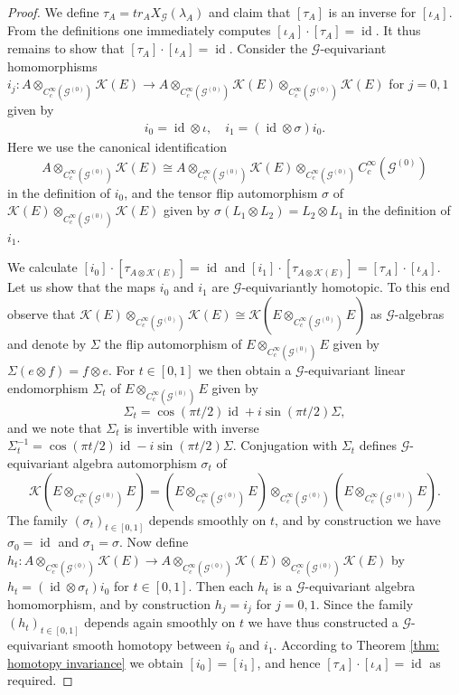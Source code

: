 \documentclass[10pt,a4paper]{amsart}
\DeclareMathOperator{\id}{id}
\newcommand{\G}{\mathcal{G}}
\newcommand{\K}{\mathcal{K}}
\newcommand{\ccinfty}{C_c^\infty}
\begin{document}
\begin{proof}
We define $ \tau_A = tr_A X_\G(\lambda_A) $ and claim that $ [\tau_A] $ is an inverse for $ [\iota_A] $. From the definitions one immediately computes 
$ [\iota_A] \cdot [\tau_A] = \id $. 
It thus remains to show that $ [\tau_A] \cdot
[\iota_A] = \id $. Consider the $ \G $-equivariant homomorphisms $ i_j: A \otimes_{\ccinfty(\G^{(0)})} \K(E) \rightarrow A \otimes_{\ccinfty(\G^{(0)})} \K(E) \otimes_{\ccinfty(\G^{(0)})} \K(E) $ for $ j = 0,1 $ given by 
\begin{align*}
i_0 = \id \otimes \iota, \quad 
i_1 = (\id \otimes \sigma) i_0. 
\end{align*}
Here we use the canonical identification 
$$ 
A \otimes_{\ccinfty(\G^{(0)})} \K(E) \cong A \otimes_{\ccinfty(\G^{(0)})} \K(E) \otimes_{\ccinfty(\G^{(0)})} \ccinfty(\G^{(0)}) 
$$ 
in the definition of $ i_0 $, and the tensor flip automorphism $ \sigma $ of $ \K(E) \otimes_{\ccinfty(\G^{(0)})} \K(E) $ given by $ \sigma(L_1 \otimes L_2) = L_2 \otimes L_1 $ in the definition of $ i_1 $. 

We calculate $ [i_0] \cdot [\tau_{A\otimes \K(E)}] = \id  $ 
and $ [i_1] \cdot [\tau_{A \otimes \K(E)}] =
[\tau_A] \cdot [\iota_A] $. Let us show that the maps $ i_0 $ and $ i_1 $ are $ \G $-equivariantly homotopic. To this end observe that $ \K(E) \otimes_{\ccinfty(\G^{(0)})} \K(E) \cong \K(E \otimes_{\ccinfty(\G^{(0)})} E)$ as $ \G $-algebras and denote by $ \Sigma $ the flip automorphism of $ E \otimes_{\ccinfty(\G^{(0)})} E $ given by $ \Sigma (e \otimes f) = f \otimes e $. For $ t \in [0,1] $ we then obtain a $ \G $-equivariant linear endomorphism $ \Sigma_t $ of $ E \otimes_{\ccinfty(\G^{(0)})} E $ given by
$$ 
\Sigma_t = \cos(\pi t/2) \id + i \sin(\pi t/2) \Sigma,
$$
and we note that $ \Sigma_t $ is invertible with inverse $ \Sigma_t^{-1} = \cos(\pi t/2) \id - i \sin(\pi t/2) \Sigma $. Conjugation with $ \Sigma_t $ defines $ \G $-equivariant algebra automorphism $ \sigma_t $ of 
$$ 
\K(E \otimes_{\ccinfty(\G^{(0)})} E) = (E \otimes_{\ccinfty(\G^{(0)})} E) \otimes_{\ccinfty(\G^{(0)})} (E \otimes_{\ccinfty(\G^{(0)})} E). 
$$ 
The family $ (\sigma_t)_{t \in [0,1]} $ depends smoothly on $ t $, and by construction we have 
$ \sigma_0 = \id $ and $ \sigma_1 = \sigma $. Now define $ h_t: A \otimes_{\ccinfty(\G^{(0)})} \K(E) \rightarrow 
A \otimes_{\ccinfty(\G^{(0)})} \K(E) \otimes_{\ccinfty(\G^{(0)})} \K(E) $ by $ h_t = (\id \otimes \sigma_t) i_0 $ for $ t \in [0,1] $. Then each $ h_t $ is a $ \G $-equivariant algebra homomorphism, and by construction
$ h_j = i_j $ for $ j = 0,1 $. Since the family $ (h_t)_{t \in [0,1]} $ depends again smoothly on $ t $ we have thus constructed a $ \G $-equivariant smooth homotopy between $ i_0 $ and $ i_1 $. According to Theorem \ref{thm: homotopy invariance} we obtain $ [i_0] = [i_1] $, and hence $ [\tau_A] \cdot [\iota_A] = \id $ as required. 
\end{proof}
\end{document}
